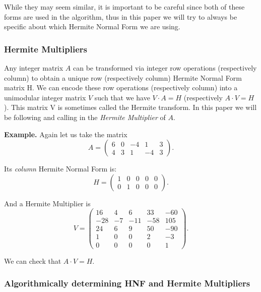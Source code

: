 \documentclass[oneside, a4paper, onecolumn, 11pt]{article}
\newenvironment{example}[1][Example]{\textbf{#1.} }{\medskip}
\begin{document}
While they may seem similar, it is important to be careful since both of these forms are used in the algorithm, thus in this paper we will try to always be specific about which Hermite Normal Form we are using.

\subsubsection{Hermite Multipliers}

Any integer matrix \(A\) can be transformed via integer row operations (respectively column) to obtain a unique row (respectively column) Hermite Normal Form matrix H. We can encode these row operations (respectively column) into a unimodular integer matrix \(V\) such that we have \(V \cdot A = H\) (respectively \(A \cdot V = H\)). This matrix V is sometimes called the Hermite transform. In this paper we will be following \cite{Hubert2013} and calling in the \textit{Hermite Multiplier} of \(A\).

\begin{example}
    Again let us take the matrix
    \[
        A = \begin{pmatrix}
            6 & 0 & -4 & 1  & 3 \\
            4 & 3 & 1  & -4 & 3
        \end{pmatrix}.
    \]

    Its \textit{column} Hermite Normal Form is:
    \[
        H = \begin{pmatrix}
            1 & 0 & 0 & 0 & 0 \\
            0 & 1 & 0 & 0 & 0
        \end{pmatrix}.
    \]

    And a Hermite Multiplier is
    \[
        V = \begin{pmatrix}
            16  & 4  & 6   & 33  & -60 \\
            -28 & -7 & -11 & -58 & 105 \\
            24  & 6  & 9   & 50  & -90 \\
            1   & 0  & 0   & 2   & -3  \\
            0   & 0  & 0   & 0   & 1
        \end{pmatrix}.
    \]

    We can check that \(A \cdot V = H\).
\end{example}


\subsubsection{Algorithmically determining HNF and Hermite Multipliers}
\end{document}
